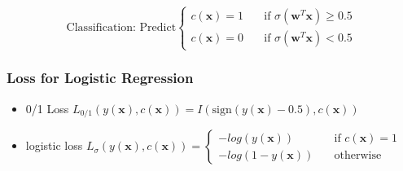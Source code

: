 \documentclass[11pt,a4paper]{article}
\begin{document}
\begin{flushleft}
$$ \text{Classification: Predict} \begin{cases}
c(\textbf{x}) = 1      & \quad \text{if } \sigma (\textbf{w}^T \textbf{x}) \geq 0.5 \\
c(\textbf{x}) = 0    & \quad \text{if } \sigma (\textbf{w}^T \textbf{x}) < 0.5
\end{cases} $$
\subsubsection{Loss for Logistic Regression}
\begin{itemize}
\item 0/1 Loss $ L_{0/1} (y(\textbf{x}), c(\textbf{x})) = I (\text{sign} (y(\textbf{x})-0.5) , c(\textbf{x})) $
\item logistic loss $  L_{\sigma} (y(\textbf{x}), c(\textbf{x})) = \begin{cases}
-log(y(\textbf{x}))      & \quad \text{if } c(\textbf{x}) = 1 \\
-log(1 - y(\textbf{x}))      & \quad \text{otherwise }
\end{cases} $
\end{itemize}

\end{flushleft}
\end{document}
